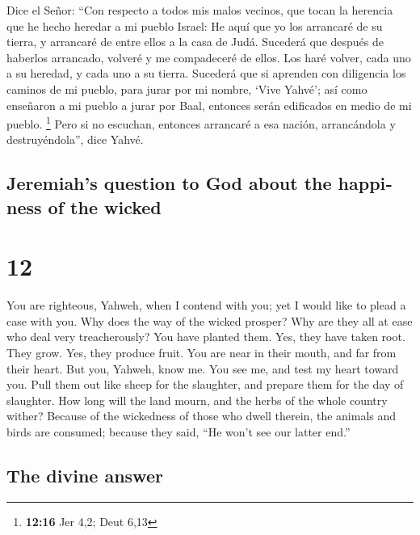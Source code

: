 \begin{paracol}{2}
 Dice el Señor: ``Con respecto a todos mis malos vecinos,
que tocan la herencia que he hecho heredar a mi pueblo Israel: He aquí
que yo los arrancaré de su tierra, y arrancaré de entre ellos a la casa
de Judá.  Sucederá que después de haberlos arrancado,
volveré y me compadeceré de ellos. Los haré volver, cada uno a su
heredad, y cada uno a su tierra.  Sucederá que si
aprenden con diligencia los caminos de mi pueblo, para jurar por mi
nombre, `Vive Yahvé'; así como enseñaron a mi pueblo a jurar por Baal,
entonces serán edificados en medio de mi pueblo. \footnote{\textbf{12:16}
  Jer 4,2; Deut 6,13}  Pero si no escuchan, entonces
arrancaré a esa nación, arrancándola y destruyéndola'', dice Yahvé.

\switchcolumn
\begin{otherlanguage}{english}

\hypertarget{jeremiahs-question-to-god-about-the-happiness-of-the-wicked}{%
\subsection{Jeremiah's question to God about the happiness of the
wicked}\label{jeremiahs-question-to-god-about-the-happiness-of-the-wicked}}

\hypertarget{section-23}{%
\section{12}\label{section-23}}

 You are righteous, Yahweh, when I contend with you; yet I
would like to plead a case with you. Why does the way of the wicked
prosper? Why are they all at ease who deal very treacherously?
 You have planted them. Yes, they have taken root. They
grow. Yes, they produce fruit. You are near in their mouth, and far from
their heart.  But you, Yahweh, know me. You see me, and
test my heart toward you. Pull them out like sheep for the slaughter,
and prepare them for the day of slaughter.  How long will
the land mourn, and the herbs of the whole country wither? Because of
the wickedness of those who dwell therein, the animals and birds are
consumed; because they said, ``He won't see our latter end.''

\hypertarget{the-divine-answer}{%
\subsection{The divine answer}\label{the-divine-answer}}


\end{otherlanguage}
\end{paracol}
